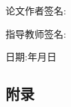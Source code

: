 \documentclass[12pt,UTF8]{ctexart}
\theoremstyle{definition}
\theoremstyle{remark}
\begin{document}
\begin{spacing}{1.625}
    \hspace*{\fill}
    
    \hspace*{\fill}
    
    \begin{spacing}{2}
    \hspace{23em}论文作者签名:

    \hspace{23em}指导教师签名:
    
    \hspace{27em}日期:\hspace{2em}年\hspace{2em}月\hspace{2em}日
    \end{spacing}
    
\end{spacing}
\cfoot{}



\newpage

\renewcommand\contentsname{目录}
\tableofcontents
\newpage
\setcounter{page}{1}
\pagestyle{fancy}
\begin{spacing}{1.25}







\newpage
{}
\section{附录}


\vspace{10em}


\newpage
\end{spacing}
\nocite{*}

\end{document}

